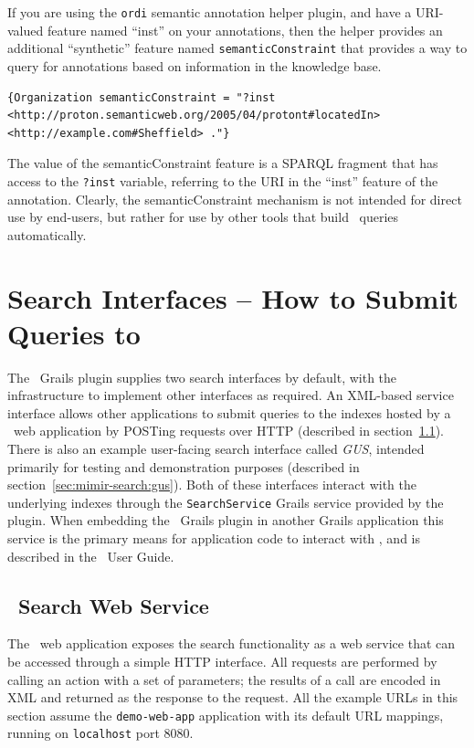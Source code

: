 If you are using the {\tt ordi} semantic annotation helper plugin, and have a
URI-valued feature named ``inst'' on your annotations, then the helper provides
an additional ``synthetic'' feature named {\tt semanticConstraint} that
provides a way to query for annotations based on information in the knowledge
base.
\begin{lstlisting}[breaklines]
{Organization semanticConstraint = "?inst <http://proton.semanticweb.org/2005/04/protont#locatedIn> <http://example.com#Sheffield> ."}
\end{lstlisting}

The value of the semanticConstraint feature is a SPARQL fragment that has
access to the {\tt ?inst} variable, referring to the URI in the ``inst''
feature of the annotation.  Clearly, the semanticConstraint mechanism is not
intended for direct use by end-users, but rather for use by other tools that
build \Mimir\ queries automatically.


\section{Search Interfaces -- How to Submit Queries to \Mimir}
\label{sec:mimir-search:interfaces}

The \Mimir\ Grails plugin supplies two search interfaces by default, with the
infrastructure to implement other interfaces as required.  An XML-based service
interface allows other applications to submit queries to the indexes hosted by
a \Mimir\ web application by POSTing requests over HTTP (described in
section~\ref{sec:mimir-search:service}).  There is also an example user-facing search
interface called {\em GUS}, intended primarily for testing and demonstration
purposes (described in section~\ref{sec:mimir-search:gus}).  Both of these interfaces
interact with the underlying indexes through the {\tt SearchService} Grails
service provided by the plugin.  When embedding the \Mimir\ Grails plugin in
another Grails application this service is the primary means for application
code to interact with \Mimir, and is described in the \Mimir\ User Guide.

\subsection{\Mimir\ Search Web Service}\label{sec:mimir-search:service}

The \Mimir\ web application exposes the search functionality as a web service
that can be accessed through a simple HTTP interface. All requests are performed
by calling an action with a set of parameters; the results of a call are encoded
in XML and returned as the response to the request.  All the example URLs in
this section assume the {\tt demo-web-app} application with its default URL
mappings, running on {\tt localhost} port 8080.

